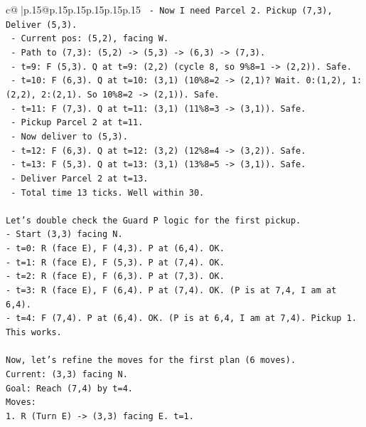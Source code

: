 \documentclass{article}
\begin{document}
{\begin{supertabular}{c@{$\;$}|p{.15\linewidth}@{}p{.15\linewidth}p{.15\linewidth}p{.15\linewidth}p{.15\linewidth}p{.15\linewidth}}
{{{\texttt{    {-} Now I need Parcel 2. Pickup (7,3), Deliver (5,3).} \\
\texttt{    {-} Current pos: (5,2), facing W.} \\
\texttt{    {-} Path to (7,3): (5,2) {-}> (5,3) {-}> (6,3) {-}> (7,3).} \\
\texttt{    {-} t=9: F (5,3). Q at t=9: (2,2) (cycle 8, so 9\%8=1 {-}> (2,2)). Safe.} \\
\texttt{    {-} t=10: F (6,3). Q at t=10: (3,1) (10\%8=2 {-}> (2,1)? Wait. 0:(1,2), 1:(2,2), 2:(2,1). So 10\%8=2 {-}> (2,1)). Safe.} \\
\texttt{    {-} t=11: F (7,3). Q at t=11: (3,1) (11\%8=3 {-}> (3,1)). Safe.} \\
\texttt{    {-} Pickup Parcel 2 at t=11.} \\
\texttt{    {-} Now deliver to (5,3).} \\
\texttt{    {-} t=12: F (6,3). Q at t=12: (3,2) (12\%8=4 {-}> (3,2)). Safe.} \\
\texttt{    {-} t=13: F (5,3). Q at t=13: (3,1) (13\%8=5 {-}> (3,1)). Safe.} \\
\texttt{    {-} Deliver Parcel 2 at t=13.} \\
\texttt{    {-} Total time 13 ticks. Well within 30.} \\
\\ 
\texttt{Let's double check the Guard P logic for the first pickup.} \\
\texttt{{-} Start (3,3) facing N.} \\
\texttt{{-} t=0: R (face E), F (4,3). P at (6,4). OK.} \\
\texttt{{-} t=1: R (face E), F (5,3). P at (7,4). OK.} \\
\texttt{{-} t=2: R (face E), F (6,3). P at (7,3). OK.} \\
\texttt{{-} t=3: R (face E), F (6,4). P at (7,4). OK. (P is at 7,4, I am at 6,4).} \\
\texttt{{-} t=4: F (7,4). P at (6,4). OK. (P is at 6,4, I am at 7,4). Pickup 1.} \\
\texttt{This works.} \\
\\ 
\texttt{Now, let's refine the moves for the first plan (6 moves).} \\
\texttt{Current: (3,3) facing N.} \\
\texttt{Goal: Reach (7,4) by t=4.} \\
\texttt{Moves:} \\
\texttt{1. R (Turn E) {-}> (3,3) facing E. t=1.} \\
}}}
\end{supertabular}}
\end{document}
